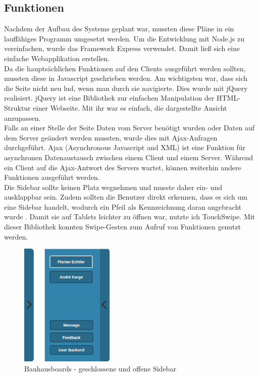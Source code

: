 \subsection{Funktionen}\label{Funktionen}
Nachdem der Aufbau des Systems geplant war, mussten diese Pläne in ein lauffähiges Programm umgesetzt werden.
Um die Entwicklung mit Node.js zu vereinfachen, wurde das Framework Express verwendet. Damit ließ sich eine einfache Webapplikation erstellen.
\\
Da die hauptsächlichen Funktionen auf den Clients ausgeführt werden sollten, mussten diese in Javascript geschrieben werden.
Am wichtigsten war, dass sich die Seite nicht neu lud, wenn man durch sie navigierte. Dies wurde mit jQuery realisiert. jQuery ist eine Bibliothek zur einfachen Manipulation der HTML-Struktur einer Webseite. Mit ihr war es einfach, die dargestellte Ansicht anzupassen.
\\
Falls an einer Stelle der Seite Daten vom Server benötigt wurden oder Daten auf dem Server geändert werden mussten, wurde dies mit Ajax-Anfragen durchgeführt. Ajax (Asynchronous Javascript and XML) ist eine Funktion für asynchronen Datenaustausch zwischen einem Client und einem Server.
Während ein Client auf die Ajax-Antwort des Servers wartet, können weiterhin andere Funktionen ausgeführt werden.
\\
Die Sidebar sollte keinen Platz wegnehmen und musste daher ein- und ausklappbar sein. Zudem sollten die Benutzer direkt erkennen, dass es sich um eine Sidebar handelt, wodurch ein Pfeil als Kennzeichnung daran angebracht wurde .
Damit sie auf Tablets leichter zu öffnen war, nutzte ich TouchSwipe. Mit dieser Bibliothek konnten Swipe-Gesten zum Aufruf von Funktionen genutzt werden.
\begin{figure}[h!]
  \centering
    \includegraphics[width=0.4\textwidth]{./img/Sidebar.png}
  \caption{Bauhausboards - geschlossene und offene Sidebar}
  \label{img:sidebar}
\end{figure}
